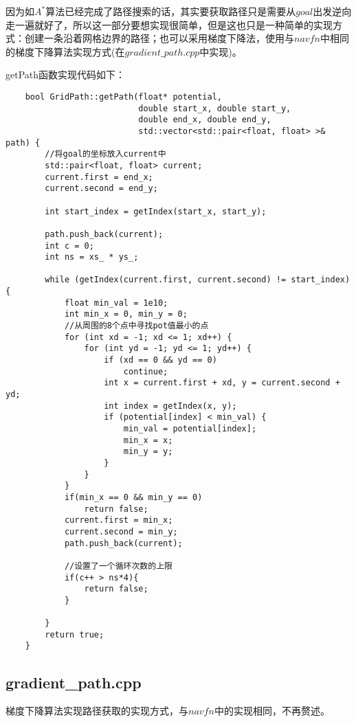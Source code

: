 \documentclass[9pt, oneside]{book}
\begin{document}
因为如$A^*$算法已经完成了路径搜索的话，其实要获取路径只是需要从$goal$出发逆向走一遍就好了，所以这一部分要想实现很简单，但是这也只是一种简单的实现方式：创建一条沿着网格边界的路径；也可以采用梯度下降法，使用与$navfn$中相同的梯度下降算法实现方式(在$gradient\_path.cpp$中实现)。

getPath函数实现代码如下：

\small
\begin{verbatim}
    bool GridPath::getPath(float* potential, 
                           double start_x, double start_y, 
                           double end_x, double end_y, 
                           std::vector<std::pair<float, float> >& path) {
        //将goal的坐标放入current中
        std::pair<float, float> current;
        current.first = end_x;
        current.second = end_y;
    
        int start_index = getIndex(start_x, start_y);
    
        path.push_back(current);
        int c = 0;
        int ns = xs_ * ys_;
        
        while (getIndex(current.first, current.second) != start_index) {
            float min_val = 1e10;
            int min_x = 0, min_y = 0;
            //从周围的8个点中寻找pot值最小的点
            for (int xd = -1; xd <= 1; xd++) {
                for (int yd = -1; yd <= 1; yd++) {
                    if (xd == 0 && yd == 0)
                        continue;
                    int x = current.first + xd, y = current.second + yd;
                    int index = getIndex(x, y);
                    if (potential[index] < min_val) {
                        min_val = potential[index];
                        min_x = x;
                        min_y = y;
                    }
                }
            }
            if(min_x == 0 && min_y == 0)
                return false;
            current.first = min_x;
            current.second = min_y;
            path.push_back(current);
            
            //设置了一个循环次数的上限
            if(c++ > ns*4){
                return false;
            }
    
        }
        return true;
    }    
\end{verbatim}
\normalsize

\subsection{gradient\_path.cpp}

梯度下降算法实现路径获取的实现方式，与$navfn$中的实现相同，不再赘述。
\end{document}
